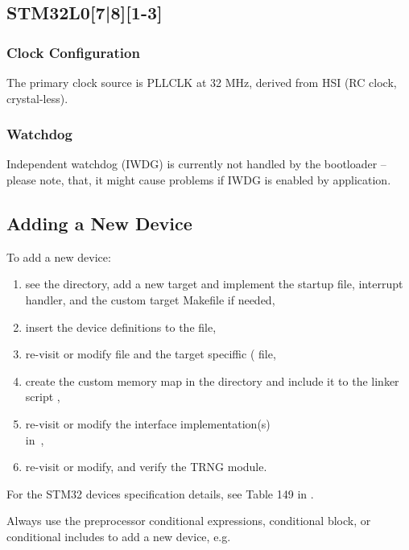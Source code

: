 
\subsection{STM32L0[7|8][1-3]}

\subsubsection{Clock Configuration}
The primary clock source is PLLCLK at 32 MHz, derived from HSI (RC clock, crystal-less).

\subsubsection{Watchdog}
Independent watchdog (IWDG) is currently not handled by the bootloader -- please note, that, it might cause problems if IWDG is enabled by application.


\subsection{Adding a New Device}

To add a new device:
\begin{enumerate}
\item see the  directory, add a new target and implement the startup file, interrupt handler, and the custom target Makefile if needed,
\item insert the device definitions to the  file, 
\item re-visit or modify  file and the target speciffic ( file,
\item create the custom memory map in the  directory and include it to the linker script ,
\item re-visit or modify the interface implementation(s)\\in~,
\item re-visit or modify, and verify the TRNG module.
\end{enumerate}

For the STM32 devices specification details, see Table 149 in \cite{STM32:AN2606}.

Always use the preprocessor conditional expressions, conditional block, or conditional includes to add a new device, e.g.  

